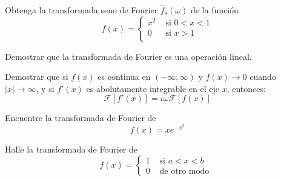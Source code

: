 \documentclass[11pt]{article}
\begin{document}
\begin{question} %
	Obtenga la transformada seno de Fourier $\hat{f}_s(\omega)$ de la función
	\[ f(x) =
		\begin{cases}
			x^2 & \text{ si } 0 < x < 1 \\
			0   & \text{ si } x > 1     \\
		\end{cases} \]
\end{question}

\begin{question}
	Demostrar que la transformada de Fourier es una operación lineal.
\end{question}

\begin{question}
	Demostrar que si $f(x)$ es continua en $(-\infty, \infty)$ y $f(x) \rightarrow 0$ cuando $|x| \rightarrow \infty$, y si $f'(x)$ es abolutamente integrable en el eje $x$, entonces:
	\[ \mathscr{F}[f'(x)] = i \omega \mathscr{F}[f(x)] \]
\end{question}

\begin{question} %
	Encuentre la transformada de Fourier de
	\[ f(x) = x e^{-x^2} \]
\end{question}

\begin{question} %
	Halle la transformada de Fourier de
	\[ f(x) =
		\begin{cases}
			1 & \text { si } a < x < b \\
			0 & \text { de otro modo }
		\end{cases}
	\]
\end{question}
\end{document}
